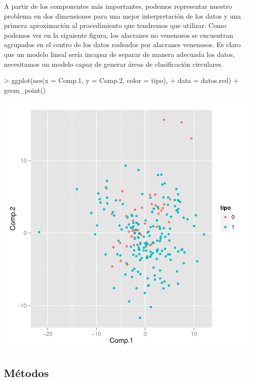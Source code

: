 \documentclass{article}
\begin{document}
A partir de los componentes más importantes, podemos representar nuestro problema en dos dimensiones para una mejor interpretación de los datos y una primera aproximación al procedimiento que tendremos que utilizar. Como podemos ver en la siguiente figura, los alacranes no venenosos se encuentran agrupados en el centro de los datos rodeados por alacranes venenosos. Es claro que un modelo lineal sería incapaz de separar de manera adecuada los datos, necesitamos un modelo capaz de generar áreas de clasificación circulares.
\begin{Schunk}
\begin{Sinput}
> ggplot(aes(x = Comp.1, y = Comp.2, color = tipo),
+        data = datos.red) + geom_point()
\end{Sinput}
\end{Schunk}
\includegraphics{Final-004}

\subsection{Métodos}
\end{document}
